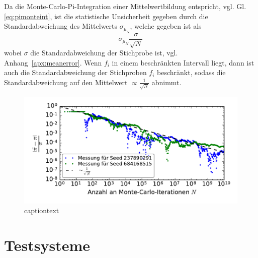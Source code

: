 Da die Monte-Carlo-Pi-Integration einer Mittelwertbildung entspricht, vgl. Gl.\ref{eq:pimonteint}, ist die statistische Unsicherheit gegeben durch die Standardabweichung des Mittelwerts $\sigma_{\mu_N}$, welche gegeben ist als
\begin{equation}
	\sigma_{\mu_N} \frac{\sigma}{\sqrt{N}}
\end{equation}
wobei $\sigma$ die Standardabweichung der Stichprobe ist, vgl. Anhang~\ref{apx:meanerror}.
Wenn $f_i$ in einem beschränkten Intervall liegt, dann ist auch die Standardabweichung der Stichproben $f_i$ beschränkt, sodass die Standardabweichung auf den Mittelwert $\propto \frac{1}{\sqrt{N}}$ abnimmt.

\begin{figure}
	\centering
	\begin{minipage}{0.7\linewidth}
		\includegraphics[width=\linewidth]{monte-carlo-pi-error-scaling}
	\end{minipage}
	\caption{captiontext}
	\label{fig:monteerrorfloat}
\end{figure}




\section{Testsysteme}


